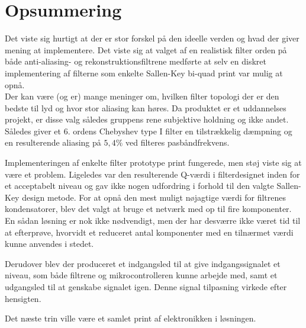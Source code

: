 \section{Opsummering}

Det viste sig hurtigt at der er stor forskel på den ideelle verden og hvad der giver mening at implementere.
Det viste sig at valget af en realistisk filter orden på både anti-aliasing- og rekonstruktionsfiltrene medførte at selv en diskret implementering af filterne som enkelte Sallen-Key bi-quad print var mulig at opnå.
\\
Der kan være (og er) mange meninger om, hvilken filter topologi der er den bedste til lyd og hvor stor aliasing kan høres.
Da produktet er et uddannelses projekt, er disse valg således gruppens rene subjektive holdning og ikke andet.
Således giver et 6. ordens Chebyshev type I filter en tilstrækkelig dæmpning og en resulterende aliasing på  $5,4\si\percent$ ved filteres pasbåndfrekvens. 

Implementeringen af enkelte filter prototype print fungerede, men støj viste sig at være et problem.
Ligeledes var den resulterende Q-værdi i filterdesignet inden for et acceptabelt niveau og gav ikke nogen udfordring i forhold til den valgte Sallen-Key design metode. 
For at opnå den mest muligt nøjagtige værdi for filtrenes kondensatorer, blev det valgt at bruge et netværk med op til fire komponenter.
En sådan løsning er nok ikke nødvendigt, men der har desværre ikke været tid til at efterprøve, hvorvidt et reduceret antal komponenter med en tilnærmet værdi kunne anvendes i stedet. %

Derudover blev der produceret et indgangsled til at give indgangssignalet et niveau, som både filtrene og mikrocontrolleren kunne arbejde med, samt et udgangsled til at genskabe signalet igen.
Denne signal tilpasning virkede efter hensigten.

Det næste trin ville være et samlet print af elektronikken i løsningen.